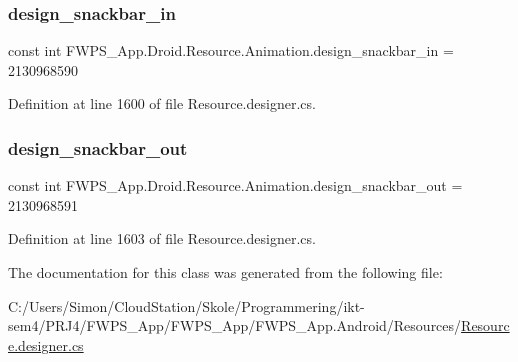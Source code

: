 \subsubsection{\texorpdfstring{design\+\_\+snackbar\+\_\+in}{design\_snackbar\_in}}
{\footnotesize\ttfamily const int F\+W\+P\+S\+\_\+\+App.\+Droid.\+Resource.\+Animation.\+design\+\_\+snackbar\+\_\+in = 2130968590}



Definition at line 1600 of file Resource.\+designer.\+cs.

\mbox{\label{class_f_w_p_s___app_1_1_droid_1_1_resource_1_1_animation_af921152f6499060210280ff88a9a1dc8}} 
\subsubsection{\texorpdfstring{design\+\_\+snackbar\+\_\+out}{design\_snackbar\_out}}
{\footnotesize\ttfamily const int F\+W\+P\+S\+\_\+\+App.\+Droid.\+Resource.\+Animation.\+design\+\_\+snackbar\+\_\+out = 2130968591}



Definition at line 1603 of file Resource.\+designer.\+cs.



The documentation for this class was generated from the following file\+:\begin{DoxyCompactItemize}
\item 
C\+:/\+Users/\+Simon/\+Cloud\+Station/\+Skole/\+Programmering/ikt-\/sem4/\+P\+R\+J4/\+F\+W\+P\+S\+\_\+\+App/\+F\+W\+P\+S\+\_\+\+App/\+F\+W\+P\+S\+\_\+\+App.\+Android/\+Resources/\mbox{\hyperlink{_resource_8designer_8cs}{Resource.\+designer.\+cs}}\end{DoxyCompactItemize}
